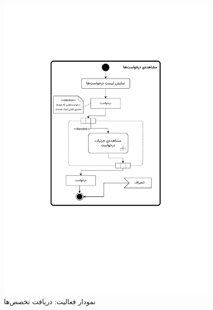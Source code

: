 \begin{figure}
	\centering
	\includegraphics[scale=0.8, page=10]{figs/OOD-activity11-20.pdf}
	\caption{نمودار فعالیت: دریافت تخصص‌ها}
\end{figure}
\FloatBarrier
\newpage

